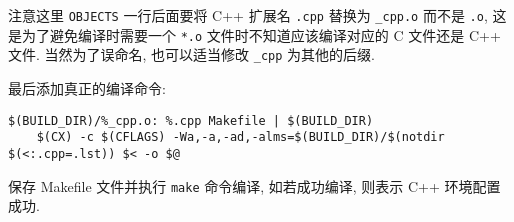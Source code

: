 注意这里 \texttt{OBJECTS} 一行后面要将 C++ 扩展名 \texttt{.cpp} 替换为 \texttt{\_cpp.o} 而不是 \texttt{.o}, 这是为了避免编译时需要一个 \texttt{*.o} 文件时不知道应该编译对应的 C 文件还是 C++ 文件. 当然为了误命名, 也可以适当修改 \texttt{\_cpp} 为其他的后缀.

最后添加真正的编译命令:

\begin{verbatim}
$(BUILD_DIR)/%_cpp.o: %.cpp Makefile | $(BUILD_DIR)
    $(CX) -c $(CFLAGS) -Wa,-a,-ad,-alms=$(BUILD_DIR)/$(notdir $(<:.cpp=.lst)) $< -o $@
\end{verbatim}

保存 Makefile 文件并执行 \texttt{make} 命令编译, 如若成功编译, 则表示 C++ 环境配置成功.
